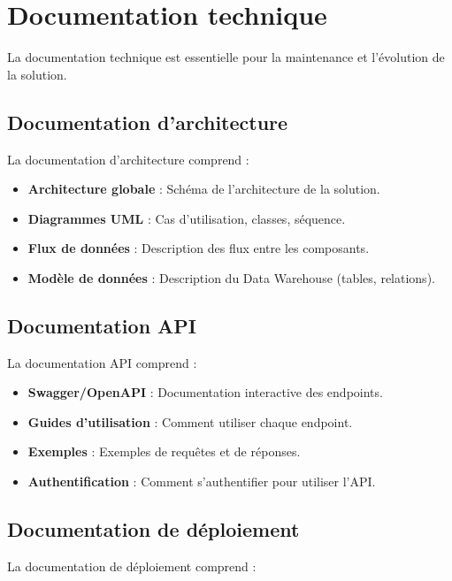\section{Documentation technique}
\label{sec:sprint8-documentation}

La documentation technique est essentielle pour la maintenance et l'évolution de la solution.

\subsection{Documentation d'architecture}

La documentation d'architecture comprend :

\begin{itemize}
    \item \textbf{Architecture globale} : Schéma de l'architecture de la solution.
    \item \textbf{Diagrammes UML} : Cas d'utilisation, classes, séquence.
    \item \textbf{Flux de données} : Description des flux entre les composants.
    \item \textbf{Modèle de données} : Description du Data Warehouse (tables, relations).
\end{itemize}

\subsection{Documentation API}

La documentation API comprend :

\begin{itemize}
    \item \textbf{Swagger/OpenAPI} : Documentation interactive des endpoints.
    \item \textbf{Guides d'utilisation} : Comment utiliser chaque endpoint.
    \item \textbf{Exemples} : Exemples de requêtes et de réponses.
    \item \textbf{Authentification} : Comment s'authentifier pour utiliser l'API.
\end{itemize}

\subsection{Documentation de déploiement}

La documentation de déploiement comprend :

